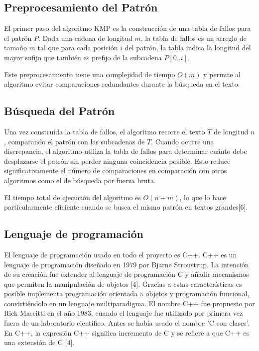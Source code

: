 \documentclass{article}
\begin{document}
\subsection{Preprocesamiento del Patrón}
El primer paso del algoritmo KMP es la construcción de una tabla de fallos para el patrón $P$. Dada una cadena de longitud $m$, la tabla de fallos es un arreglo de tamaño $m$ tal que para cada posición $i$ del patrón, la tabla indica la longitud del mayor sufijo que también es prefijo de la subcadena $P[0..i]$.

Este preprocesamiento tiene una complejidad de tiempo $O(m)$ y permite al algoritmo evitar comparaciones redundantes durante la búsqueda en el texto.

\subsection{Búsqueda del Patrón}
Una vez construida la tabla de fallos, el algoritmo recorre el texto $T$ de longitud $n$, comparando el patrón con las subcadenas de $T$. Cuando ocurre una discrepancia, el algoritmo utiliza la tabla de fallos para determinar cuánto debe desplazarse el patrón sin perder ninguna coincidencia posible. Esto reduce significativamente el número de comparaciones en comparación con otros algoritmos como el de búsqueda por fuerza bruta.

El tiempo total de ejecución del algoritmo es $O(n + m)$, lo que lo hace particularmente eficiente cuando se busca el mismo patrón en textos grandes[6].


\subsection{Lenguaje de programación}
El lenguaje de programación usado en todo el proyecto es C++. C++ es un lenguaje de programación diseñado en 1979 por Bjarne Stroustrup. La intención de su creación fue extender al lenguaje de programación C y añadir mecanismos que permiten la manipulación de objetos [4]. Gracias a estas características es posible implementa programación orientada a objetos y programación funcional, convirtiéndolo en un lenguaje multiparadigma. El nombre C++ fue propuesto por Rick Mascitti en el año 1983, cuando el lenguaje fue utilizado por primera vez fuera de un laboratorio científico. Antes se había usado el nombre 'C con clases'. En C++, la expresión C++ significa incremento de C y se refiere a que C++ es una extensión de C [4].
\end{document}
